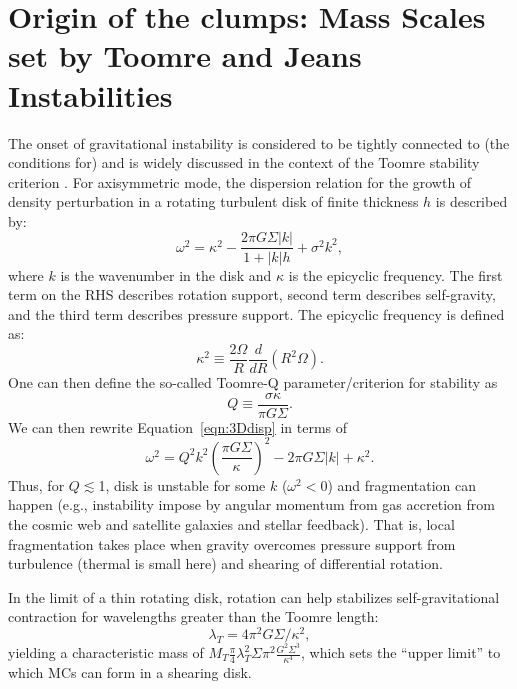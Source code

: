 \IfFileExists{emulateapjlegacy.cls}{\documentclass[iop]{emulateapjlegacy}}{\documentclass[iop]{emulateapj}}
\begin{document}
\section{Origin of the clumps: Mass Scales set by Toomre and Jeans Instabilities}   \label{sec:Q}
The onset of gravitational instability is considered to be tightly connected to (the conditions for) \SF \citep[e.g.,][]{Kennicutt89a, Li05b, Li06a}
and is widely discussed in the context of the Toomre stability criterion \citep{Toomre64a, Goldreich65b}.
For axisymmetric mode, the dispersion relation for the growth of density perturbation in a rotating turbulent disk
of finite thickness $h$
is described by:
\begin{equation}
\omega^2 = \kappa^2 - \frac{2\pi G \Sigma |k|}{1 + |k| h} + \sigma^2 k^2,
\label{eqn:3Ddisp}
\end{equation}
where $k$ is the wavenumber in the disk and $\kappa$ is the epicyclic frequency.
The first term on the RHS describes rotation support, second term describes self-gravity, and
the third term describes pressure support.
The epicyclic frequency is defined as:
\begin{equation}
\kappa^2\equiv\frac{2\Omega}{R}\frac{d}{dR}\left(R^2\Omega\right).
\label{eqn:kappa}
\end{equation}
One can then define the so-called Toomre-Q parameter/criterion for stability as
\begin{equation}
Q\equiv\frac{\sigma\kappa}{\pi G \Sigma}.
\label{eqn:Q}
\end{equation}
We can then rewrite Equation~\ref{eqn:3Ddisp} in terms of
\begin{equation}
\omega^2 = Q^2 k^2 \left(\frac{\pi G \Sigma}{\kappa}\right)^2 - 2\pi G \Sigma |k| + \kappa^2.
\end{equation}
Thus, for $Q\lesssim$1, disk is unstable for some $k$ ($\omega^2 < 0$)
and fragmentation can happen
(e.g., instability impose by angular momentum from gas accretion from the cosmic web and
satellite galaxies and stellar feedback).
That is, local fragmentation takes place when gravity overcomes pressure support
from turbulence (thermal is small here) and shearing of differential rotation.

In the limit of a thin rotating disk, rotation can help stabilizes
self-gravitational contraction for wavelengths greater than the Toomre length:
\begin{equation}
\lambda_T = 4\pi^2 G\Sigma/\kappa^2,
\end{equation}
yielding a characteristic mass of $M_T$\eq$\frac{\pi}{4}{\lambda_T^2}{\Sigma}$$\pi^2\frac{G^2\Sigma^3}{\kappa^4}$,
which sets the ``upper limit'' to which MCs can form in a shearing disk.
\end{document}
